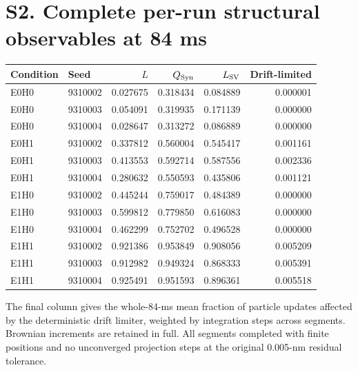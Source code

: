 \documentclass[11pt,letterpaper]{article}
\begin{document}
\section*{S2. Complete per-run structural observables at 84 ms}
\begin{center}\small
\begin{tabular}{llrrrr}
\toprule
Condition & Seed & $L$ & $Q_{\rm Syn}$ & $L_{\rm SV}$ & Drift-limited \\ \midrule
E0H0 & 9310002 & 0.027675 & 0.318434 & 0.084889 & 0.000001 \\
E0H0 & 9310003 & 0.054091 & 0.319935 & 0.171139 & 0.000000 \\
E0H0 & 9310004 & 0.028647 & 0.313272 & 0.086889 & 0.000000 \\
E0H1 & 9310002 & 0.337812 & 0.560004 & 0.545417 & 0.001161 \\
E0H1 & 9310003 & 0.413553 & 0.592714 & 0.587556 & 0.002336 \\
E0H1 & 9310004 & 0.280632 & 0.550593 & 0.435806 & 0.001121 \\
E1H0 & 9310002 & 0.445244 & 0.759017 & 0.484389 & 0.000000 \\
E1H0 & 9310003 & 0.599812 & 0.779850 & 0.616083 & 0.000000 \\
E1H0 & 9310004 & 0.462299 & 0.752702 & 0.496528 & 0.000000 \\
E1H1 & 9310002 & 0.921386 & 0.953849 & 0.908056 & 0.005209 \\
E1H1 & 9310003 & 0.912982 & 0.949324 & 0.868333 & 0.005391 \\
E1H1 & 9310004 & 0.925491 & 0.951593 & 0.896361 & 0.005518 \\
\bottomrule\end{tabular}\end{center}
The final column gives the whole-84-ms mean fraction of particle updates
affected by the deterministic drift limiter, weighted by integration
steps across segments. Brownian increments are retained in full.
All segments completed with finite positions and no unconverged
projection steps at the original 0.005-nm residual tolerance.
\clearpage
\end{document}
